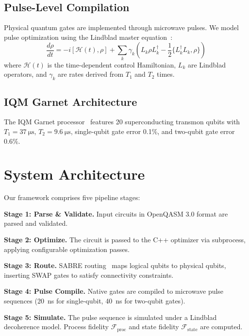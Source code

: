 \documentclass[journal]{IEEEtran}
\newcommand{\fid}{\mathcal{F}}
\newcommand{\ham}{\mathcal{H}}
\begin{document}
\subsection{Pulse-Level Compilation}

Physical quantum gates are implemented through microwave pulses. We model pulse optimization using the Lindblad master equation~\cite{lindblad1976generators}:
\begin{equation}
    \frac{d\rho}{dt} = -i[\ham(t), \rho] + \sum_k \gamma_k \left( L_k \rho L_k^{\dagger} - \frac{1}{2}\{L_k^{\dagger}L_k, \rho\} \right)
\end{equation}
where $\ham(t)$ is the time-dependent control Hamiltonian, $L_k$ are Lindblad operators, and $\gamma_k$ are rates derived from $T_1$ and $T_2$ times.

\subsection{IQM Garnet Architecture}

The IQM Garnet processor~\cite{iqm2024garnet} features 20 superconducting transmon qubits with $T_1 = \SI{37}{\micro\second}$, $T_2 = \SI{9.6}{\micro\second}$, single-qubit gate error 0.1\%, and two-qubit gate error 0.6\%.

\section{System Architecture}

Our framework comprises five pipeline stages:

\textbf{Stage 1: Parse \& Validate.} Input circuits in OpenQASM 3.0 format are parsed and validated.

\textbf{Stage 2: Optimize.} The circuit is passed to the C++ optimizer via subprocess, applying configurable optimization passes.

\textbf{Stage 3: Route.} SABRE routing~\cite{li2019tackling} maps logical qubits to physical qubits, inserting SWAP gates to satisfy connectivity constraints.

\textbf{Stage 4: Pulse Compile.} Native gates are compiled to microwave pulse sequences (\SI{20}{\nano\second} for single-qubit, \SI{40}{\nano\second} for two-qubit gates).

\textbf{Stage 5: Simulate.} The pulse sequence is simulated under a Lindblad decoherence model. Process fidelity $\fid_{\text{proc}}$ and state fidelity $\fid_{\text{state}}$ are computed.
\end{document}
